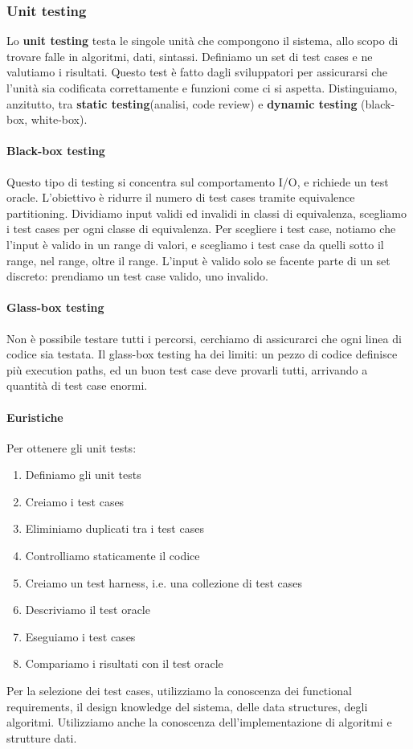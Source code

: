 \documentclass[11pt]{article}
\begin{document}
\subsubsection{Unit testing}
Lo \textbf{unit testing} testa le singole unità che compongono il sistema, allo scopo di trovare falle in algoritmi, dati, sintassi. Definiamo un set di test cases e ne valutiamo i risultati. Questo test è fatto dagli sviluppatori per assicurarsi che l'unità sia codificata correttamente e funzioni come ci si aspetta.
Distinguiamo, anzitutto, tra \textbf{static testing}(analisi, code review) e \textbf{dynamic testing} (black-box, white-box).
\paragraph{Black-box testing} Questo tipo di testing si concentra sul comportamento I/O, e richiede un test oracle. L'obiettivo è ridurre il numero di test cases  tramite equivalence partitioning. Dividiamo input validi ed invalidi in classi di equivalenza, scegliamo i test cases per ogni classe di equivalenza. Per scegliere i test case, notiamo che l'input è valido in un range di valori, e scegliamo i test case da quelli sotto il range, nel range, oltre il range. L'input è valido solo se facente parte di un set discreto: prendiamo un test case valido, uno invalido. 
\paragraph{Glass-box testing} Non è possibile testare tutti i percorsi, cerchiamo di assicurarci che ogni linea di codice sia testata. Il glass-box testing ha dei limiti: un pezzo di codice definisce più execution paths, ed un buon test case deve provarli tutti, arrivando a quantità di test case enormi. 
\paragraph{Euristiche} Per ottenere gli unit tests:
\begin{enumerate}
    \item Definiamo gli unit tests
    \item Creiamo i test cases 
    \item Eliminiamo duplicati tra i test cases 
    \item Controlliamo staticamente il codice 
    \item Creiamo un test harness, i.e. una collezione di test cases 
    \item Descriviamo il test oracle 
    \item Eseguiamo i test cases 
    \item Compariamo i risultati con il test oracle
\end{enumerate}
Per la selezione dei test cases, utilizziamo la conoscenza dei functional requirements, il design knowledge del sistema, delle data structures, degli algoritmi. Utilizziamo anche la conoscenza dell'implementazione di algoritmi e strutture dati. 
\end{document}
